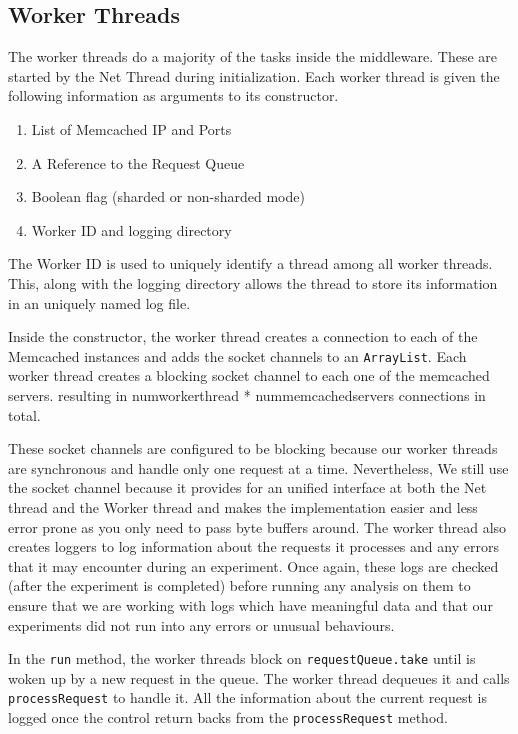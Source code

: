 \documentclass[11pt,a4paper]{article}
\begin{document}
\subsection{Worker Threads}
The worker threads do a majority of the tasks inside the middleware. These are started by the Net Thread during initialization. Each worker thread is given the following information as arguments to its constructor.
\begin{enumerate}
	  \setlength{\itemsep}{0pt}
	  \setlength{\parskip}{0pt}
	  \setlength{\parsep}{0pt}
	\item List of Memcached IP and Ports
	\item A Reference to the Request Queue
	\item Boolean flag (sharded or non-sharded mode)
	\item Worker ID and logging directory 
\end{enumerate}
The Worker ID is used to uniquely identify a thread among all worker threads. This, along with the logging directory allows the thread to store its information in an uniquely named log file.

Inside the constructor, the worker thread creates a connection to each of the Memcached instances and adds the socket channels to an \texttt{ArrayList}. 
Each worker thread creates a blocking socket channel to each one of the memcached servers. resulting in num\textunderscore worker\textunderscore thread * num\textunderscore memcached\textunderscore servers connections in total.  

These socket channels are configured to be blocking because our worker threads are synchronous and handle only one request at a time. Nevertheless, We still use the socket channel because it provides for an unified interface at both the Net thread and the Worker thread and makes the implementation easier and less error prone as you only need to pass byte buffers around. The worker thread also creates loggers to log information about the requests it processes and any errors that it may encounter during an experiment. Once again, these logs are checked (after the experiment is completed) before running any analysis on them to ensure that we are working with logs which have meaningful data and that our experiments did not run into any errors or unusual behaviours.

In the \texttt{run} method, the worker threads block on \texttt{requestQueue.take} until is woken up by a new request in the queue. The worker thread dequeues it and calls \texttt{processRequest} to handle it. All the information about the current request is logged once the control return backs from the \texttt{processRequest} method.
\end{document}
